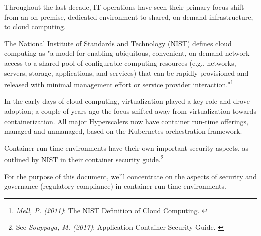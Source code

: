Throughout the last decade, IT operations have seen their primary focus shift from an on-premise, dedicated environment to shared, on-demand infrastructure, to cloud computing.

The National Institute of Standards and Technology (NIST) defines cloud computing as "a model for enabling ubiquitous, convenient, on-demand network access to a shared pool of configurable computing resources (e.g., networks, servers, storage, applications, and services) that can be rapidly provisioned and released with minimal management effort or service provider interaction."\footnote{\textit{Mell, P. (2011)}: The NIST Definition of Cloud Computing. \cite{sp800-145}}

In the early days of cloud computing, virtualization played a key role and drove adoption; a couple of years ago the focus shifted away from virtualization towards containerization. All major Hyperscalers now have container run-time offerings, managed and unmanaged, based on the Kubernetes orchestration framework.

Container run-time environments have their own important security aspects, as outlined by NIST in their container security guide.\footnote{See \textit{Souppaya, M. (2017)}: Application Container Security Guide. \cite{sp800-190}}

For the purpose of this document, we'll concentrate on the aspects of security and governance (regulatory compliance) in container run-time environments.
